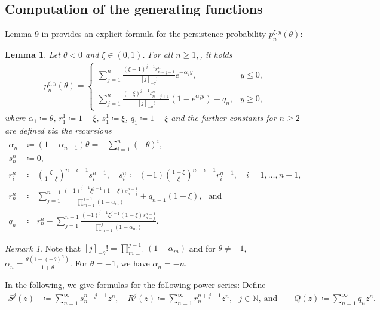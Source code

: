 \documentclass[12pt]{article}
\newcommand{\N}{\mathbb{N}} %
\newcommand{\1}{\mathds{1}}
\newcommand{\s}{\mathscr{S}}
\theoremstyle{definition}
\theoremstyle{plain}
\newtheorem{Lemma}[definition]{Lemma}
\theoremstyle{remark}
\newtheorem{Remark}{Remark}
\begin{document}
\subsection{Computation of the generating functions}
Lemma 9 in \cite{AR} provides an explicit formula for the persistence probability $p_n^{\xi,y}(\theta)$:
\begin{Lemma}\label{pers_prob_neg_theta}
    Let $\theta<0$ and $\xi\in(0,1)$. For all $n\geq1,$, it holds
        \begin{align*}
        p_n^{\xi,y}(\theta)= \begin{cases}
        \sum_{j=1}^n\frac{(\xi-1)^{j-1}r^n_{n-j+1}}{[j]_{-\theta}!}e^{-\alpha_jy}, & y\leq 0,
       \\
       \sum_{j=1}^n\frac{(-\xi)^{j-1}s^n_{n-j+1}}{[j]_{-\theta}!}(1-e^{\alpha_jy})+q_n, & y\geq 0,
       \end{cases}
    \end{align*}
where $\alpha_1\coloneqq\theta$, $r_1^1\coloneqq 1-\xi$, $s_1^1\coloneqq \xi$, $q_1\coloneqq 1-\xi$ and the further constants for $n\ge 2$ are defined via the recursions
\begin{align*}
    \alpha_n&\coloneqq (1-\alpha_{n-1})\theta=-\sum_{i=1}^n(-\theta)^i,
    \\s_n^n&\coloneqq 0,
  \\ r_{i}^n&\coloneqq\left( \frac{\xi}{1-\xi}\right)^{n-i-1} s_{i}^{n-1}, \quad s_i^n\coloneqq(-1)\left( \frac{1-\xi}{\xi}\right)^{n-i-1} r_i^{n-1},\quad i=1,\ldots,n-1,
 \\ r_n^n&\coloneqq\sum_{j=1}^{n-1} \frac{(-1)^{j-1} \xi^{j-1} (1-\xi) s_{n-j}^{n-1}}{\prod_{m=1}^{j-1} (1-\alpha_m)}+ q_{n-1}(1-\xi),~~~\text{and}
 \\q_n&\coloneqq r_n^n- \sum_{j=1}^{n-1} \frac{(-1)^{j-1}\xi^{j-1} (1-\xi) s_{n-j}^{n-1}}{\prod_{m=1}^{j} (1-\alpha_m)}.
\end{align*}
\end{Lemma}
\begin{Remark}
    Note that $[j]_{-\theta}!=\prod_{m=1}^{j-1} (1-\alpha_m)$ and for $\theta\neq-1$, $\alpha_n=\frac{\theta(1-(-\theta)^n)}{1+\theta}$. For $\theta=-1$, we have $\alpha_n=-n$.
\end{Remark}
In the following, we give formulas for the following power series: Define
\begin{align*}
    S^j(z)&\coloneqq\sum_{n=1}^\infty s_n^{n+j-1}z^n,\quad R^j(z)\coloneqq\sum_{n=1}^\infty r_n^{n+j-1}z^n,~~~j\in\N,~\text{and}\qquad
    Q(z)\coloneqq\sum_{n=1}^\infty q_nz^n.
\end{align*}
\end{document}
